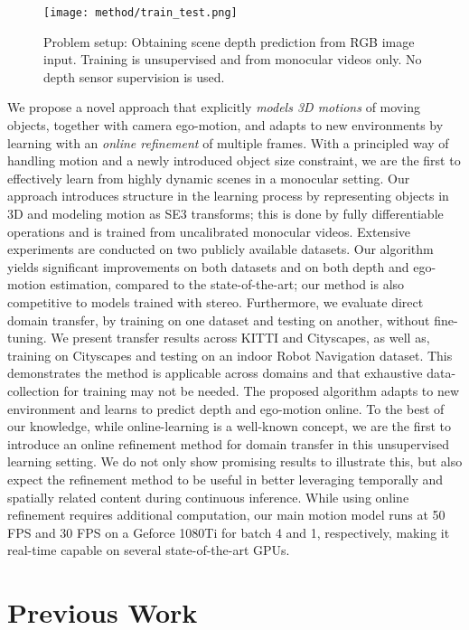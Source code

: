 \documentclass[letterpaper]{article} \usepackage{aaai19}  \usepackage{times}  \usepackage{helvet}  \usepackage{courier}  \usepackage{url}  \usepackage{graphicx}  \frenchspacing
\begin{document}
\begin{figure}[t]
    \centering
    \texttt{[image: method/train\_test.png]}
    \caption{Problem setup: Obtaining scene depth prediction from RGB image input.
   Training is unsupervised and from monocular videos only. No depth sensor supervision is used.}
    \label{fig:first}
\end{figure}

We propose a novel approach that explicitly {\it models 3D motions} of moving objects, together with camera ego-motion, and adapts to new environments by learning with an {\it online refinement} of multiple frames.
With a principled way of handling motion and a newly introduced object size constraint, we are the first to effectively learn from highly dynamic scenes in a monocular setting. Our approach introduces structure in the learning process by representing objects in 3D and modeling motion as SE3 transforms; this is done by fully differentiable operations and is trained from uncalibrated monocular videos. 
Extensive experiments are conducted on two publicly available datasets.
Our algorithm yields significant improvements on both datasets and on both depth and ego-motion estimation, compared to the state-of-the-art; our method is also competitive to models trained with stereo. Furthermore, we evaluate direct domain transfer, by training on one dataset and testing on another, without fine-tuning. We present transfer results across KITTI and Cityscapes, as well as, training on Cityscapes and testing on an indoor Robot Navigation dataset. This demonstrates the method is applicable across domains and that exhaustive data-collection for training may not be needed. The proposed algorithm adapts to new environment and learns to predict depth and ego-motion online. To the best of our knowledge, while online-learning is a well-known concept, we are the first to introduce an online refinement method for domain transfer in this unsupervised learning setting. We do not only show promising results to illustrate this, but also expect the refinement method to be useful in better leveraging temporally and spatially related content during continuous inference. While using online refinement requires additional computation, our main motion model runs at 50 FPS and 30 FPS on a Geforce 1080Ti for batch 4 and 1, respectively, making it real-time capable on several state-of-the-art GPUs.

\section{Previous Work}
\end{document}
